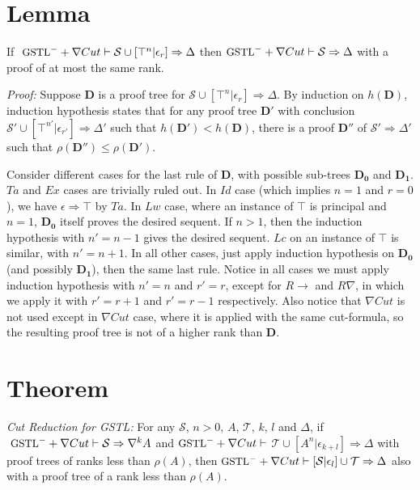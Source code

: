 \section{Lemma}\label{true-assum} If $~\small\text{GSTL}^- + \nabla Cut \vdash \mathcal{S} \cup [\top^n | \epsilon_r] \Rightarrow \Delta$ then $\small\text{GSTL}^- + \nabla Cut \vdash \mathcal{S} \Rightarrow \Delta$ with a proof of at most the same rank.

\textit{Proof:} Suppose $\mathbf{D}$ is a proof tree for $\mathcal{S} \cup [\top^n | \epsilon_r] \Rightarrow \Delta$. By induction on $h(\mathbf{D})$, induction hypothesis states that for any proof tree $\mathbf{D}'$ with conclusion $\mathcal{S'} \cup [\top^{n'} | \epsilon_{r'}] \Rightarrow \Delta'$ such that $h(\mathbf{D}') < h(\mathbf{D})$, there is a proof $\mathbf{D}''$ of $\mathcal{S}' \Rightarrow \Delta'$ such that $\rho(\mathbf{D}'') \leq \rho(\mathbf{D}')$.

Consider different cases for the last rule of $\mathbf{D}$, with possible sub-trees $\mathbf{D_0}$ and $\mathbf{D_1}$. $Ta$ and $Ex$ cases are trivially ruled out. In $Id$ case (which implies $n = 1$ and $r = 0$), we have $\epsilon \Rightarrow \top$ by $Ta$. In $Lw$ case, where an instance of $\top$ is principal and $n = 1$, $\mathbf{D_0}$ itself proves the desired sequent. If $n > 1$, then the induction hypothesis with $n' = n - 1$ gives the desired sequent. $Lc$ on an instance of $\top$ is similar, with $n' = n + 1$. In all other cases, just apply induction hypothesis on $\mathbf{D_0}$ (and possibly $\mathbf{D_1}$), then the same last rule. Notice in all cases we must apply induction hypothesis with $n' = n$ and $r' = r$, except for $R\rightarrow$ and $R\nabla$, in which we apply it with $r' = r + 1$ and $r' = r - 1$ respectively. Also notice that $\nabla Cut$ is not used except in $\nabla Cut$ case, where it is applied with the same cut-formula, so the resulting proof tree is not of a higher rank than $\mathbf{D}$.

\section{Theorem}\label{cut-admis} \emph{Cut Reduction for GSTL: } For any $\mathcal{S}$, $n>0$, $A$, $\mathcal{T}$, $k$, $l$ and $\Delta$, if $~\small\text{GSTL}^- + \nabla Cut \vdash \mathcal{S} \Rightarrow \nabla^k A$ and $\small\text{GSTL}^- + \nabla Cut \vdash$ $\mathcal{T} \cup [A^n | \epsilon_{k+l}] \Rightarrow \Delta$ with proof trees of ranks less than $\rho(A)$, then
 $\small\text{GSTL}^- + \nabla Cut \vdash [ \mathcal{S} | \epsilon_l ] \cup \mathcal{T} \Rightarrow \Delta$ also with a proof tree of a rank less than $\rho(A)$.
 
